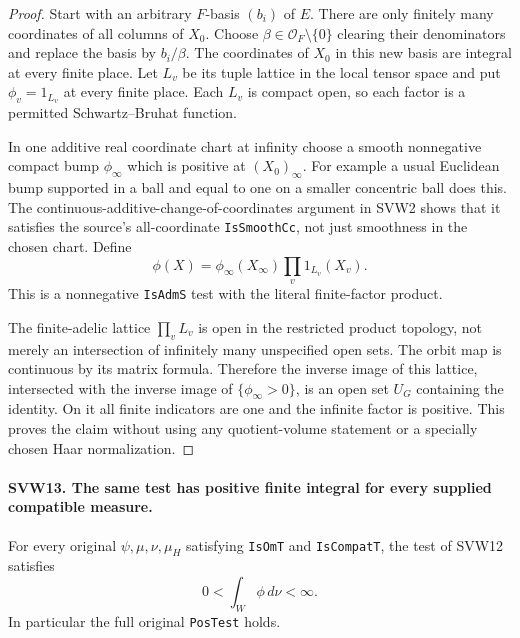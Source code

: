 \documentclass[11pt,a4paper]{article}
\numberwithin{equation}{section}
\theoremstyle{remark}\newtheorem{remark}[theorem]{Remark}
\begin{document}
\begin{proof}
Start with an arbitrary $F$-basis $(b_i)$ of $E$.  There are only
finitely many coordinates of all columns of $X_0$.  Choose
$\beta\in\mathcal O_F\setminus\{0\}$ clearing their denominators
and replace the basis by $b_i/\beta$.  The coordinates of $X_0$
in this new basis are integral at every finite place.  Let $L_v$
be its tuple lattice in the local tensor space and put
$\phi_v=1_{L_v}$ at every finite place.  Each $L_v$ is compact
open, so each factor is a permitted Schwartz--Bruhat function.

In one additive real coordinate chart at infinity choose a smooth
nonnegative compact bump $\phi_\infty$ which is positive at
$(X_0)_\infty$.  For example a usual Euclidean bump supported in
a ball and equal to one on a smaller concentric ball does this.
The continuous-additive-change-of-coordinates argument in SVW2
shows that it satisfies the source's all-coordinate
\texttt{Is\allowbreak Smooth\allowbreak Cc}, not just smoothness in the chosen chart.
Define
\[
                  \phi(X)=\phi_\infty(X_\infty)
                                      \prod_v1_{L_v}(X_v).
 \tag{SVW.26}
\]
This is a nonnegative \texttt{Is\allowbreak Adm\allowbreak S} test with the literal
finite-factor product.

The finite-adelic lattice $\prod_v L_v$ is open in the restricted
product topology, not merely an intersection of infinitely many
unspecified open sets.  The orbit map is continuous by its matrix
formula.  Therefore the inverse image of this lattice, intersected
with the inverse image of $\{\phi_\infty>0\}$, is an open set
$U_G$ containing the identity.  On it all finite indicators are
one and the infinite factor is positive.  This proves the claim
without using any quotient-volume statement or a specially chosen
Haar normalization.
\end{proof}

\paragraph{SVW13. The same test has positive finite integral for every supplied compatible measure.}
\label{claim:SVW13}
For every original $\psi,\mu,\nu,\mu_H$ satisfying
\texttt{Is\allowbreak Om\allowbreak T} and \texttt{Is\allowbreak Compat\allowbreak T}, the test of SVW12 satisfies
\[
                         0<\int_W\phi\,d\nu<\infty.
 \tag{SVW.27}
\]
In particular the full original \texttt{Pos\allowbreak Test} holds.
\end{document}
